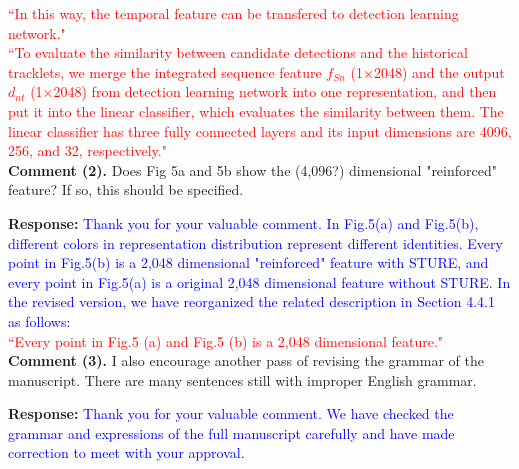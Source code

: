 \documentclass[12pt,journal,onecolumn]{IEEEtran}
\begin{document}
\textcolor{red}{
``In this way, the temporal feature can be transfered to detection learning network."
} \\
\textcolor{red}{
``To evaluate the similarity between candidate detections and the historical tracklets, we merge the integrated sequence feature $f_{Sn}$ (1$\times$2048) and the output $d_{nt}$ (1$\times$2048) from detection learning network into one representation, 
and then put it into the linear classifier, which evaluates the similarity between them.
The linear classifier has three fully connected layers and its input dimensions are 4096, 256, and 32, respectively."
} \\



\textbf{Comment (2).} Does Fig 5a and 5b show the (4,096?) dimensional "reinforced" feature? 
If so, this should be specified.


\textbf{Response:} \textcolor{blue}{Thank you for your valuable comment.
In Fig.5(a) and Fig.5(b), different colors in representation distribution represent different identities.
Every point in Fig.5(b) is a 2,048 dimensional "reinforced" feature with STURE, and every point in Fig.5(a) is a original 2,048 dimensional feature without STURE.
In the revised version, we have reorganized the related description in Section 4.4.1 as follows: 
} \\
\textcolor{red}{
	``Every point in Fig.5 (a) and Fig.5 (b) is a 2,048 dimensional feature."
} \\



\textbf{Comment (3).} I also encourage another pass of revising the grammar of the manuscript. 
There are many sentences still with improper English grammar.


\textbf{Response:} \textcolor{blue}{Thank you for your valuable comment.
We have checked the grammar and expressions of the full manuscript carefully and have made correction to meet with your approval. 
}


%





\vspace{8pt}


\vspace{8pt}

\newpage






\vspace{8pt} 


\vspace{8pt}


%
\end{document}

